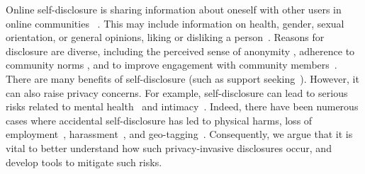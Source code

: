 Online self-disclosure is sharing information about oneself with other users in online communities ~\cite{wang_modeling_2016,joinson_oxford_2007}. This may include information on health, gender, sexual orientation, or general opinions, \eg liking or disliking a person~\cite{lee_online_2023}. Reasons for disclosure are diverse, including the perceived sense of anonymity \cite{ma_anonymity_2016}, adherence to community norms \cite{chen_i_2024}, and to improve engagement with community members~\cite{chen_revisiting_2018}. There are many benefits of self-disclosure (such as support seeking~\cite{choudhury_mental_2014}). However, it can also raise privacy concerns. %
For example, self-disclosure can lead to serious risks related to mental health~\cite{wood_student_2014,tay_mental_2018,nobels_just_2023} %
and intimacy~\cite{lee_effects_2019}.
Indeed, there have been numerous cases where accidental self-disclosure has led to physical harms, \eg loss of employment~\cite{ott_reputation_2013},  harassment~\cite{lauckner_catfishing_2019}, and geo-tagging~\cite{harrigian_geocoding_2018}.
Consequently, we argue that it is vital to better understand how such privacy-invasive disclosures occur, and develop tools to mitigate such risks.

